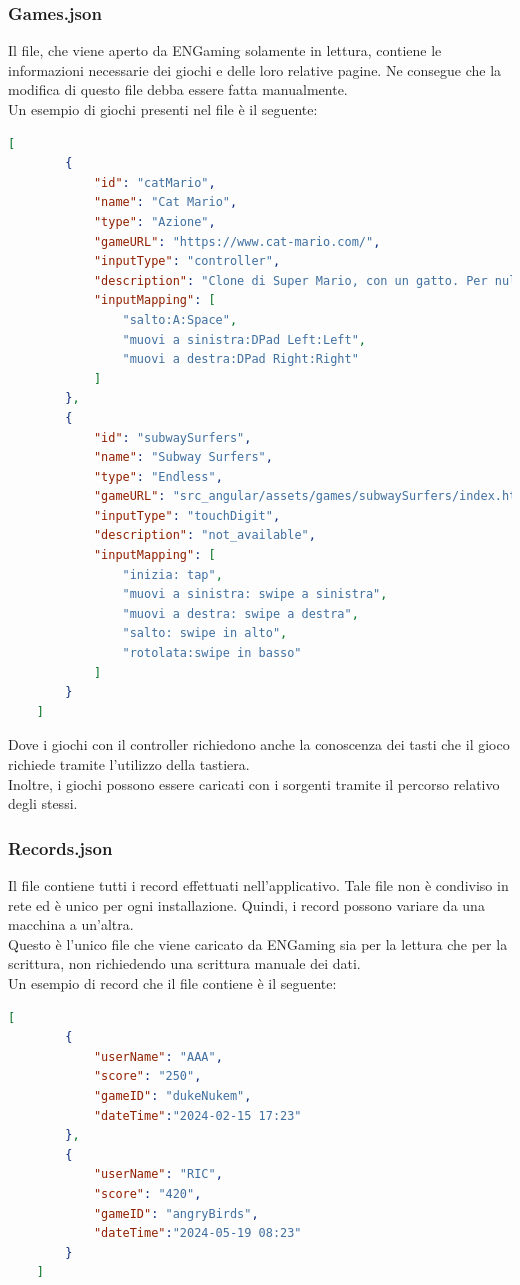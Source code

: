 \subsubsection{Games.json}
Il file, che viene aperto da ENGaming solamente in lettura, contiene le informazioni necessarie dei giochi e delle loro relative pagine. Ne consegue che la modifica di questo file debba essere fatta manualmente.\\
Un esempio di giochi presenti nel file è il seguente:
\begin{lstlisting}[language=json,firstnumber=1]
    [
        {
            "id": "catMario",
            "name": "Cat Mario",
            "type": "Azione",
            "gameURL": "https://www.cat-mario.com/",
            "inputType": "controller",
            "description": "Clone di Super Mario, con un gatto. Per nulla stressante!",
            "inputMapping": [
                "salto:A:Space",
                "muovi a sinistra:DPad Left:Left",
                "muovi a destra:DPad Right:Right"
            ]
        },
        {
            "id": "subwaySurfers",
            "name": "Subway Surfers",
            "type": "Endless",
            "gameURL": "src_angular/assets/games/subwaySurfers/index.html",
            "inputType": "touchDigit",
            "description": "not_available",
            "inputMapping": [
                "inizia: tap",
                "muovi a sinistra: swipe a sinistra",
                "muovi a destra: swipe a destra",
                "salto: swipe in alto",
                "rotolata:swipe in basso"
            ]
        }
    ]
\end{lstlisting}
Dove i giochi con il controller richiedono anche la conoscenza dei tasti che il gioco richiede tramite l'utilizzo della tastiera.\\
Inoltre, i giochi possono essere caricati con i sorgenti tramite il percorso relativo degli stessi.
\newpage
\subsubsection{Records.json}
Il file contiene tutti i record effettuati nell'applicativo. Tale file non è condiviso in rete ed è unico per ogni installazione. Quindi, i record possono variare da una macchina a un'altra.\\
Questo è l'unico file che viene caricato da ENGaming sia per la lettura che per la scrittura, non richiedendo una scrittura manuale dei dati.\\
Un esempio di record che il file contiene è il seguente:
\begin{lstlisting}[language=json,firstnumber=1]
    [
        {
            "userName": "AAA",
            "score": "250",
            "gameID": "dukeNukem",
            "dateTime":"2024-02-15 17:23"
        },
        {
            "userName": "RIC",
            "score": "420",
            "gameID": "angryBirds",
            "dateTime":"2024-05-19 08:23"
        }
    ]
\end{lstlisting}
